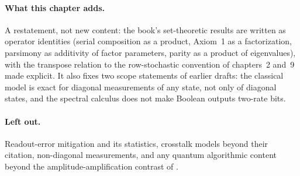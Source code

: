 \paragraph{What this chapter adds.}
A restatement, not new content: the book's set-theoretic results are
written as operator identities (serial composition as a product, Axiom~1
as a factorization, parsimony as additivity of factor parameters, parity
as a product of eigenvalues), with the transpose relation to the
row-stochastic convention of chapters~2 and~9 made explicit. It also
fixes two scope statements of earlier drafts: the classical model is exact
for diagonal measurements of any state, not only of diagonal states, and
the spectral calculus does not make Boolean outputs two-rate bits.

\paragraph{Left out.}
Readout-error mitigation and its statistics, crosstalk models beyond
their citation, non-diagonal measurements, and any quantum algorithmic
content beyond the amplitude-amplification contrast of
.
